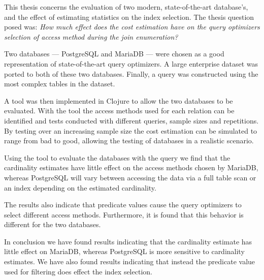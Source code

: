This thesis concerns the evaluation of two modern, state-of-the-art database's,
and the effect of estimating statistics on the index selection. The thesis
question posed was:
\textit{How much effect does the cost estimation have on the query optimizers
  selection of access method during the join enumeration?}

Two databases --- PostgreSQL and MariaDB --- were chosen as a good representation of
state-of-the-art query optimizers. A large enterprise dataset was ported to both
of these two databases. Finally, a query was constructed using the most complex
tables in the dataset.

A tool was then implemented in Clojure to allow the two databases to be
evaluated. With the tool the access methods used for each relation can be
identified and tests conducted with different queries, sample sizes and repetitions.
By testing over an increasing sample size the cost estimation can be simulated
to range from bad to good, allowing the testing of databases in a realistic
scenario.

Using the tool to evaluate the databases with the query we find that the
cardinality estimates have little effect on the access methods chosen by
MariaDB, whereas PostgreSQL will vary between accessing the data via a full
table scan or an index depending on the estimated cardinality.

The results also indicate that predicate values cause the query optimizers to
select different access methods. Furthermore, it is found that this behavior is
different for the two databases.

In conclusion we have found results indicating that the cardinality estimate has
little effect on MariaDB, whereas PostgreSQL is more sensitive to cardinality
estimates. We have also found results indicating that instead the predicate
value used for filtering does effect the index selection.